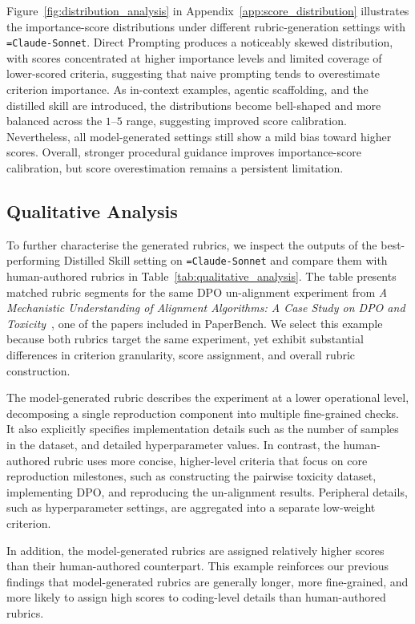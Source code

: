 \documentclass[11pt]{article}
\newif\ifreview
\newcommand{\hh}[1]{%
\ifreview
{\textcolor{orange!90!black}{#1}}
\else
#1
\fi
}
\newcommand{\hyphentt}[1]{\texttt{\hyphenchar\font=\defaulthyphenchar #1}}
\begin{document}
Figure~\ref{fig:distribution_analysis} in Appendix~\ref{app:score_distribution} illustrates the importance-score distributions under different rubric-generation settings with \hyphentt{Claude-Sonnet}. Direct Prompting produces a noticeably skewed distribution, with scores concentrated at higher importance levels and limited coverage of lower-scored criteria, suggesting that naive prompting tends to overestimate criterion importance. As in-context examples, agentic scaffolding, and the distilled skill are introduced, the distributions become bell-shaped and more balanced across the $1$--$5$ range, suggesting improved score calibration. Nevertheless, all model-generated settings still show a mild bias toward higher scores. Overall, stronger procedural guidance improves importance-score calibration, but score overestimation remains a persistent limitation.

\subsection{Qualitative Analysis}
\label{sec:case_study}
To further characterise the generated rubrics, we inspect the outputs of the best-performing Distilled Skill setting on \hyphentt{Claude-Sonnet} and compare them with human-authored rubrics in Table~\ref{tab:qualitative_analysis}. The table presents matched rubric segments for the same DPO un-alignment experiment from \textit{A Mechanistic Understanding of Alignment Algorithms: A Case Study on DPO and Toxicity}~\cite{10.5555/3692070.3693122}, one of the papers included in PaperBench. We select this example because both rubrics target the same experiment, yet exhibit substantial differences in criterion granularity, score assignment, and overall rubric construction.

 The model-generated rubric describes the experiment at a lower operational level, decomposing a single reproduction component into multiple fine-grained checks. It also explicitly specifies implementation details such as the number of samples in the dataset, and detailed hyperparameter values. In contrast, the human-authored rubric uses more concise, higher-level criteria that focus on core reproduction milestones, such as constructing the pairwise toxicity dataset, implementing DPO, and reproducing the un-alignment results. Peripheral details, such as hyperparameter settings, are aggregated into a separate low-weight criterion. \hh{In addition, the model-generated rubrics are assigned relatively higher scores than their human-authored counterpart. This example reinforces our previous findings that model-generated rubrics are generally longer, more fine-grained, and more likely to assign high scores to coding-level details than human-authored rubrics.}
\end{document}
